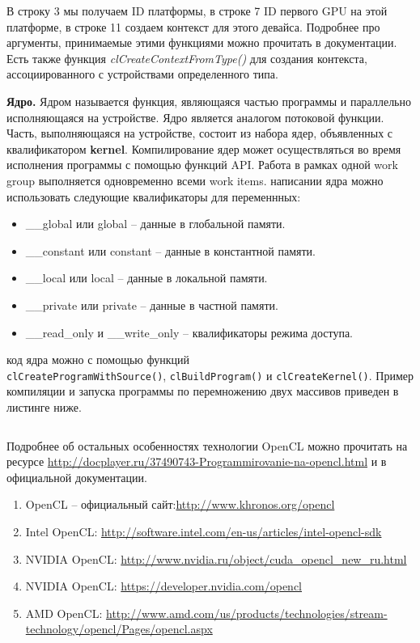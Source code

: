 {	В строку 3 мы получаем ID платформы, в строке 7 ID первого GPU на этой платформе, в строке 11 создаем контекст для этого девайса. Подробнее про аргументы, принимаемые этими функциями можно прочитать в документации. Есть также функция \textit{clCreateContextFromType()} для создания контекста, ассоциированного с устройствами определенного типа.
	\par\textbf{Ядро.} Ядром называется функция, являющаяся частью программы и параллельно исполняющаяся на устройстве. Ядро является аналогом потоковой функции. Часть, выполняющаяся на устройстве, состоит из набора ядер, объявленных с квалификатором \textbf{\textunderscore \textunderscore kernel}. Компилирование ядер может осуществляться во время исполнения программы с помощью функций API. Работа в рамках одной work group выполняется одновременно всеми work items.
	 написании ядра можно использовать следующие квалификаторы для переменнных:
		\begin{itemize}
			\item\_\_global или global -- данные в глобальной памяти.
			\item\_\_constant или constant -- данные в константной памяти.
			\item\_\_local или local -- данные в локальной памяти.
			\item\_\_private или private -- данные в частной памяти.
			\item\_\_read\_only и \_\_write\_only -- квалификаторы режима доступа.
		\end{itemize}
	 код ядра можно с помощью функций \\ \texttt{clCreateProgramWithSource()}, \texttt{clBuildProgram()} и \texttt{clCreateKernel()}. Пример компиляции и запуска программы по перемножению двух массивов приведен в листинге ниже.

    \inputminted{c++}{listings/opencl_kernel_example.cpp}

 
    Подробнее об остальных особенностях технологии OpenCL можно прочитать на ресурсе \url{http://docplayer.ru/37490743-Programmirovanie-na-opencl.html} и в официальной документации.
    
	\begin{enumerate}
		\item OpenCL – официальный сайт:\url{http://www.khronos.org/opencl}
		\item Intel OpenCL: \url{http://software.intel.com/en-us/articles/intel-opencl-sdk}
		\item NVIDIA OpenCL: \url{http://www.nvidia.ru/object/cuda_opencl_new_ru.html}
        \item NVIDIA OpenCL: \url{https://developer.nvidia.com/opencl}
		\item AMD OpenCL: \url{http://www.amd.com/us/products/technologies/stream-technology/opencl/Pages/opencl.aspx}
	\end{enumerate}
}